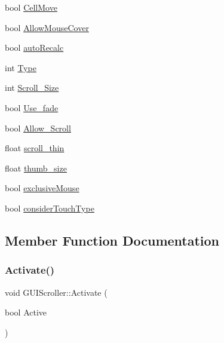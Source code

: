 \begin{DoxyCompactItemize}
\item 
bool \hyperlink{class_g_u_i_scroller_a531f10dde7250c6d41f071c5f4d0fbb1}{Cell\+Move}
\item 
bool \hyperlink{class_g_u_i_scroller_aaf2181dd1bacc5c7810feec907370008}{Allow\+Mouse\+Cover}
\item 
bool \hyperlink{class_g_u_i_scroller_a3d8c0d83c54ae3b72f17bfce3f7baf9e}{auto\+Recalc}
\item 
int \hyperlink{class_g_u_i_scroller_a46c95423b8202a4d4fbbe58875cd8cfd}{Type}
\item 
int \hyperlink{class_g_u_i_scroller_a66255161cd0e9a41d2207e5867154f37}{Scroll\+\_\+\+Size}
\item 
bool \hyperlink{class_g_u_i_scroller_a4ff1b51b767261f1a340afeca94f3051}{Use\+\_\+fade}
\item 
bool \hyperlink{class_g_u_i_scroller_a74ebbe4ef5c5adc7bb3794172b49d8cb}{Allow\+\_\+\+Scroll}
\item 
float \hyperlink{class_g_u_i_scroller_a6ce0ae21e12aa8cf88d52edf72ba9e6a}{scroll\+\_\+thin}
\item 
float \hyperlink{class_g_u_i_scroller_abbe9fafc690b1200bb27f4b1ec7ebe51}{thumb\+\_\+size}
\item 
bool \hyperlink{class_g_u_i_scroller_a25bf71f529debfe3512ead3d10cc827d}{exclusive\+Mouse}
\item 
bool \hyperlink{class_g_u_i_scroller_a6ed12ea2592f0bf03c590a4e6c24d361}{consider\+Touch\+Type}
\end{DoxyCompactItemize}


\subsection{Member Function Documentation}
\hypertarget{class_g_u_i_scroller_ac6b445a1c8683252abffd068e863992a}{}\label{class_g_u_i_scroller_ac6b445a1c8683252abffd068e863992a} 
\subsubsection{\texorpdfstring{Activate()}{Activate()}}
{\footnotesize\ttfamily void G\+U\+I\+Scroller\+::\+Activate (\begin{DoxyParamCaption}\item[{bool}]{Active }\end{DoxyParamCaption})}

\hypertarget{class_g_u_i_scroller_a56e02aa89a92bc45028f381737872f80}{}\label{class_g_u_i_scroller_a56e02aa89a92bc45028f381737872f80} 
